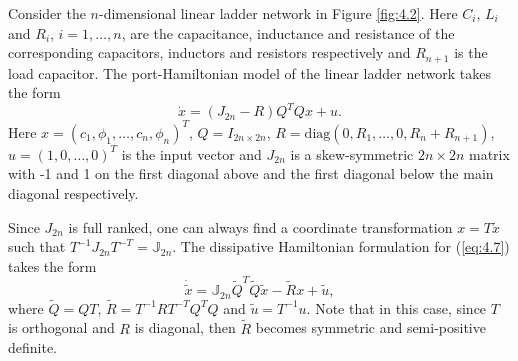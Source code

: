 Consider the $n$-dimensional linear ladder network in Figure \ref{fig:4.2}. Here $C_i$, $L_i$ and $R_i$, $i=1,\dots,n$, are the capacitance, inductance and resistance of the corresponding capacitors, inductors and resistors respectively and $R_{n+1}$ is the load capacitor. The port-Hamiltonian model of the linear ladder network takes the form
\begin{equation} \label{eq:4.7}
		\dot x = (J_{2n} - R)Q^TQx + u.
\end{equation}
Here $x = (c_1,\phi_1,\dots,c_n,\phi_n)^T$, $Q = I_{2n\times 2n}$, $R = \text{diag}(0,R_1,\dots,0,R_n+R_{n+1})$, $u=(1,0,\dots,0)^T$ is the input vector and $J_{2n}$ is a skew-symmetric $2n\times 2n$ matrix with -1 and 1 on the first diagonal above and the first diagonal below the main diagonal respectively. 

Since $J_{2n}$ is full ranked, one can always find a coordinate transformation $ x= T \tilde x$ such that $T^{-1} J_{2n} T^{-T} = \mathbb J_{2n}$. The dissipative Hamiltonian formulation for (\ref{eq:4.7}) takes the form
\begin{equation}
	\dot {\tilde x} = \mathbb J_{2n} \tilde Q^T\tilde Q \tilde x - \tilde Rx + \tilde u,
\end{equation}
where $\tilde Q = QT$, $\tilde R = T^{-1}RT^{-T}Q^TQ$ and $\tilde u = T^{-1} u$. Note that in this case, since $T$ is orthogonal and $R$ is diagonal, then $\tilde R$ becomes symmetric and semi-positive definite. 



